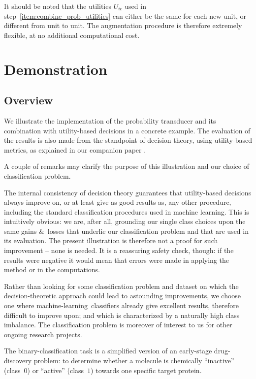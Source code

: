 \documentclass[a4paper,12pt,%
onecolumn,oneside,article,%
british%
]{memoir}
\newcommand*{\amp}{\&}
\renewcommand*{\|}[1][]{\nonscript\:#1\vert\nonscript\:\mathopen{}}
\newcommand*{\ml}{machine-learning}
\begin{document}
It should be noted that the utilities $U_{ic}$ used in step~\ref{item:combine_prob_utilities} can either be the same for each new unit, or different from unit to unit. The augmentation procedure is therefore extremely flexible, at no additional computational cost.

\section{Demonstration}
\label{sec:demonstration}

\subsection{Overview}
\label{sec:demo_overview}

We illustrate the implementation of the probability transducer and its combination with utility-based decisions in a concrete example. The evaluation of the results is also made from the standpoint of decision theory, using utility-based metrics, as explained in our companion paper \autocites{dyrlandetal2022}.

A couple of remarks may clarify the purpose of this illustration and our choice of classification problem.

The internal consistency of decision theory guarantees that utility-based decisions always improve on, or at least give as good results as, any other procedure, including the standard classification procedures used in machine learning. This is intuitively obvious: we are, after all, grounding our single class choices upon the same gains \amp\ losses that underlie our classification problem and that are used in its evaluation. The present illustration is therefore not a proof for such improvement -- none is needed. It is a reassuring safety check, though: if the results were negative it would mean that errors were made in applying the method or in the computations.

Rather than looking for some classification problem and dataset on which the decision-theoretic approach could lead to astounding improvements, we choose one where \ml\ classifiers already give excellent results, therefore difficult to improve upon; and which is characterized by a naturally high class imbalance. The classification problem is moreover of interest to us for other ongoing research projects.

The binary-classification task is a simplified version of an early-stage drug-discovery problem: to determine whether a molecule is chemically \enquote{inactive} (class~$0$) or \enquote{active} (class~$1$) towards one specific target protein.
\end{document}
